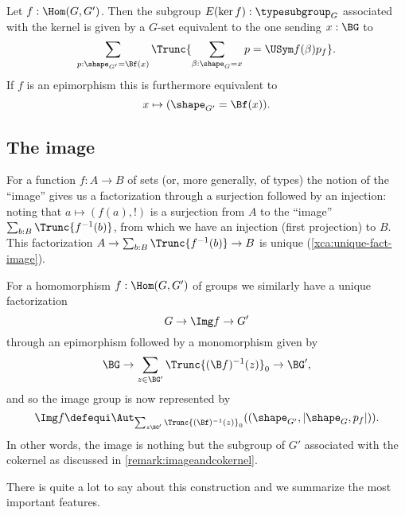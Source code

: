 \begin{xca}
  Let $f:\Hom(G,G')$.  Then the subgroup $E(\ker f):\typesubgroup_G$ associated with the kernel is given by a $G$-set equivalent to the one sending $x:\BG$ to
  $$\sum_{p:\shape_{G'}=\Bf(x)}\Trunc{\sum_{\beta:\shape_G=x}p=\USym f(\beta)p_f}.$$
  If $f$ is an epimorphism this is furthermore equivalent to
  $$x\mapsto(\shape_{G'}=\Bf(x)).$$
\end{xca}

\subsection{The image}
\label{sec:image}


For a function $f:A\to B$ of sets (or, more generally, of types) the notion of the ``image'' gives us a factorization through a surjection followed by an injection: noting that $a\mapsto (f(a),!)$ is a surjection from $A$ to the ``image'' $\sum_{b:B}\Trunc{f^{-1}(b)}$, from which we have an injection (first projection) to $B$.
This factorization $A\to\sum_{b:B}\Trunc{f^{-1}(b)}\to B$ is unique (\cref{xca:unique-fact-image}).

For a homomorphism $f:\Hom(G,G')$ of groups we similarly have a unique factorization
$$G\to \Img f \to G'
$$
through an epimorphism followed by a monomorphism given by
$$\BG\to\sum_{z\in\BG'}\Trunc{(\B f)^{-1}(z)}_0\to \BG',$$
and so the image group is now represented by %
$$\Img f\defequi\Aut_{\sum_{z\BG'}\Trunc{(\Bf)^{-1}(z)}_0}((\shape_{G'},|\shape_G,p_f|)).$$
In other words, the image is nothing but the subgroup of ${G'}$ associated with the cokernel as discussed in \cref{remark:imageandcokernel}.

There is quite a lot to say about this construction and we summarize the most important features.

